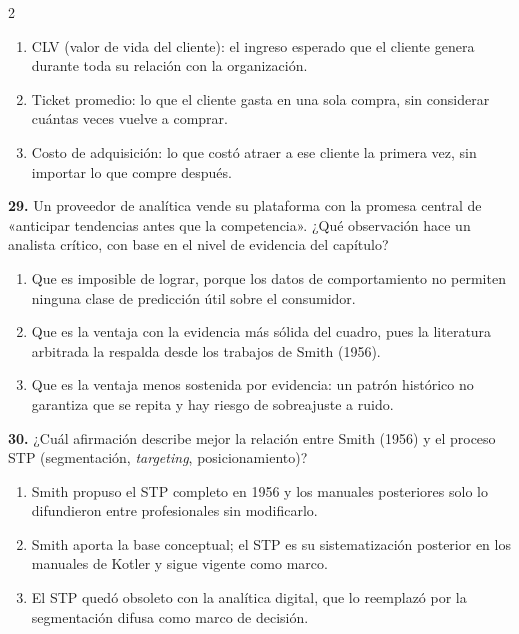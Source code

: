 \documentclass[10pt,letterpaper]{article}
\begin{document}
\begin{multicols}{2}
\vspace{-3pt}
\begin{enumerate}[label=\alph*),leftmargin=1.1em,itemsep=0pt,topsep=1pt,parsep=0pt,partopsep=0pt]
\item CLV (valor de vida del cliente): el ingreso esperado que el cliente genera durante toda su relación con la organización.
\item Ticket promedio: lo que el cliente gasta en una sola compra, sin considerar cuántas veces vuelve a comprar.
\item Costo de adquisición: lo que costó atraer a ese cliente la primera vez, sin importar lo que compre después.
\end{enumerate}
\vspace{2pt}
\noindent\textbf{29.} Un proveedor de analítica vende su plataforma con la promesa central de «anticipar tendencias antes que la competencia». ¿Qué observación hace un analista crítico, con base en el nivel de evidencia del capítulo?
\vspace{-3pt}
\begin{enumerate}[label=\alph*),leftmargin=1.1em,itemsep=0pt,topsep=1pt,parsep=0pt,partopsep=0pt]
\item Que es imposible de lograr, porque los datos de comportamiento no permiten ninguna clase de predicción útil sobre el consumidor.
\item Que es la ventaja con la evidencia más sólida del cuadro, pues la literatura arbitrada la respalda desde los trabajos de Smith (1956).
\item Que es la ventaja menos sostenida por evidencia: un patrón histórico no garantiza que se repita y hay riesgo de sobreajuste a ruido.
\end{enumerate}
\vspace{2pt}
\noindent\textbf{30.} ¿Cuál afirmación describe mejor la relación entre Smith (1956) y el proceso STP (segmentación, \textit{targeting}, posicionamiento)?
\vspace{-3pt}
\begin{enumerate}[label=\alph*),leftmargin=1.1em,itemsep=0pt,topsep=1pt,parsep=0pt,partopsep=0pt]
\item Smith propuso el STP completo en 1956 y los manuales posteriores solo lo difundieron entre profesionales sin modificarlo.
\item Smith aporta la base conceptual; el STP es su sistematización posterior en los manuales de Kotler y sigue vigente como marco.
\item El STP quedó obsoleto con la analítica digital, que lo reemplazó por la segmentación difusa como marco de decisión.
\end{enumerate}
\vspace{2pt}
\end{multicols}
\end{document}
